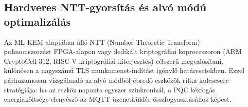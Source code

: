\subsection{Hardveres NTT-gyorsítás és alvó módú optimalizálás}

Az ML-KEM alapjában álló NTT (Number Theoretic Transform) polinomszorzást FPGA-alapon
vagy dedikált kriptográfiai koproceszoron (ARM CryptoCell-312, RISC-V kriptográfiai
kiterjesztés) célszerű megvalósítani, különösen a nagyszámú TLS munkamenet-indítást
igénylő határesetekben. Ezzel párhuzamosan vizsgálandó az alvó módból ébredő eszközök
ritka kulcscsere-stratégiája: ha az eszköz naponta egyszer szinkronizál, a PQC kézfogás
energiaköltsége elenyésző az MQTT üzenetküldés összfogyasztásához képest.
